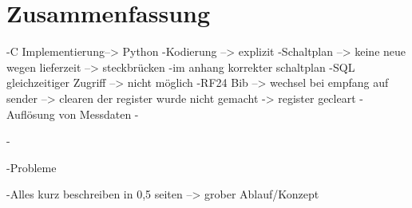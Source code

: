 \section{Zusammenfassung}
-C Implementierung--> Python
-Kodierung --> explizit
-Schaltplan --> keine neue wegen lieferzeit --> steckbrücken
	-im anhang korrekter schaltplan
-SQL gleichzeitiger Zugriff --> nicht möglich
-RF24 Bib --> wechsel bei empfang auf sender --> clearen der register wurde nicht gemacht
	-> register gecleart 
-Auflösung von Messdaten
-

-

-Probleme

-Alles kurz beschreiben in 0,5 seiten  --> grober Ablauf/Konzept